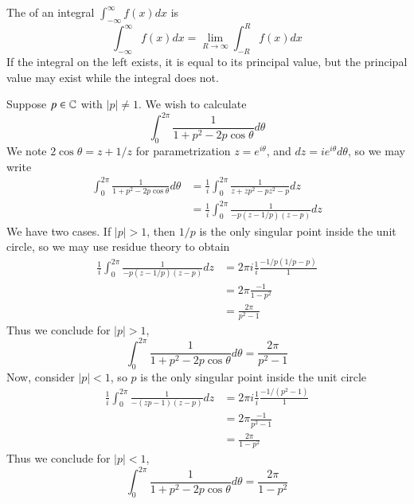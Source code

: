 \begin{remark}
    The  of an integral $\int_{-\infty}^{\infty}f(x)dx$ is \begin{equation*}
        \int_{-\infty}^{\infty}f(x)dx = \lim\limits_{R\rightarrow \infty}\int_{-R}^{R}f(x)dx
    \end{equation*}
    If the integral on the left exists, it is equal to its principal value, but the principal value may exist while the integral does not.
\end{remark}

\begin{example}
    Suppose $p \in \mathbb C$ with $|p| \neq 1$. We wish to calculate \begin{equation*}
        \int_0^{2\pi}\frac{1}{1+p^2-2p\cos\theta}d\theta
    \end{equation*}
    We note $2\cos\theta = z+1/z$ for parametrization $z = e^{i\theta}$, and $dz = ie^{i\theta}d\theta$, so we may write \begin{align*}
        \int_0^{2\pi}\frac{1}{1+p^2-2p\cos\theta}d\theta &= \frac{1}{i}\int_0^{2\pi}\frac{1}{z+zp^2-pz^2-p}dz \\
        &= \frac{1}{i}\int_0^{2\pi}\frac{1}{-p(z-1/p)(z-p)}dz 
    \end{align*}
    We have two cases. If $|p| > 1$, then $1/p$ is the only singular point inside the unit circle, so we may use residue theory to obtain \begin{align*}
        \frac{1}{i}\int_0^{2\pi}\frac{1}{-p(z-1/p)(z-p)}dz &= 2\pi i\frac{1}{i}\frac{-1/p(1/p-p)}{1} \\
        &= 2\pi\frac{-1}{1-p^2} \\
        &= \frac{2\pi}{p^2-1}
    \end{align*}
    Thus we conclude for $|p| > 1$, \begin{equation*}
        \int_0^{2\pi}\frac{1}{1+p^2-2p\cos\theta}d\theta = \frac{2\pi}{p^2-1}
    \end{equation*}
    Now, consider $|p|<1$, so $p$ is the only singular point inside the unit circle \begin{align*}
        \frac{1}{i}\int_0^{2\pi}\frac{1}{-(zp-1)(z-p)}dz &= 2\pi i\frac{1}{i}\frac{-1/(p^2-1)}{1} \\
        &= 2\pi\frac{-1}{p^2-1} \\
        &= \frac{2\pi}{1-p^2}
    \end{align*}
    Thus we conclude for $|p| < 1$, \begin{equation*}
        \int_0^{2\pi}\frac{1}{1+p^2-2p\cos\theta}d\theta = \frac{2\pi}{1-p^2}
    \end{equation*}
\end{example}




